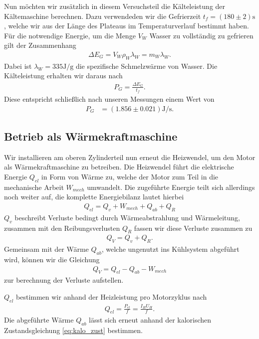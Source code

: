 Nun möchten wir zusätzlich in diesem Versuchsteil die Kälteleistung der Kältemaschine berechnen. Dazu verwendeden wir die Gefrierzeit $t_f = (180 \pm 2)\si{\second}$, welche wir aus der Länge des Plateaus im Temperaturverlauf bestimmt haben. Für die notwendige Energie, um die Menge $V_W$ Wasser zu vollständig zu gefrieren gilt der Zusammenhang
\begin{align}
    \Delta E_G = V_W \rho_W \lambda_W = m_W \lambda_W.
\end{align}
Dabei ist $\lambda_W = 335\si{\joule\per\gram}$ die spezifische Schmelzwärme von Wasser. Die Kälteleistung erhalten wir daraus nach
\begin{align}
    P_G = \frac{\Delta E_G}{t_f}.
\end{align}
Diese entspricht schließlich nach unseren Messungen einem Wert von
\begin{align}
    P_G &= (1.856 \pm 0.021)\si{\joule\per\second}.
\end{align}

\subsection{Betrieb als Wärmekraftmaschine}

Wir installieren am oberen Zylinderteil nun erneut die Heizwendel, um den Motor als Wärmekraftmaschine zu betreiben. Die Heizwendel führt die elektrische Energie $Q_{el}$ in Form von Wärme zu, welche der Motor zum Teil in die mechanische Arbeit $W_{mech}$ umwandelt. Die zugeführte Energie teilt sich allerdings noch weiter auf, die komplette Energiebilanz lautet hierbei
\begin{align}
    Q_{el} = Q_v + W_{mech} + Q_{ab} + Q_R
\end{align}
$Q_v$ beschreibt Verluste bedingt durch Wärmeabstrahlung und Wärmeleitung, zusammen mit den Reibungsverlusten $Q_R$ fassen wir diese Verluste zusammen zu
\begin{align}
    Q_{V} = Q_v + Q_R.
\end{align}
Gemeinsam mit der Wärme $Q_{ab}$, welche ungenutzt ins Kühlsystem abgeführt wird, können wir die Gleichung
\begin{align}
    Q_{V} = Q_{el} - Q_{ab} - W_{mech} \label{eq:Q_V}
\end{align}
zur berechnung der Verluste aufstellen.

$Q_{el}$ bestimmen wir anhand der Heizleistung pro Motorzyklus nach
\begin{align}
    Q_{el} = \frac{P_{el}}{f} = \frac{I_H U_H}{f}.
\end{align}
Die abgeführte Wärme $Q_{ab}$ lässt sich erneut anhand der kalorischen Zustandsgleichung \eqref{eq:kalo_zust} bestimmen. 

